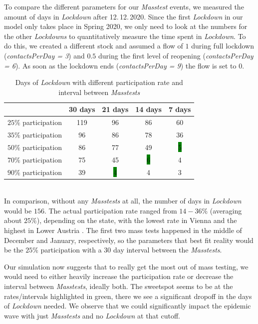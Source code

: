 \documentclass
[
    report,
    11pt,
    bibliography = totoc,
    listof = totoc,
    headinclude = true,
]
{scrreport}
\begin{document}
To compare the different parameters for our \textit{Masstest} events, we measured the amount of days in \textit{Lockdown} after 12.\,12.\,2020. Since the first \textit{Lockdown} in our model only
takes place in Spring 2020, we only need to look at the numbers for the other \textit{Lockdowns}
to quantitatively measure the time spent in \textit{Lockdown}.
To do this, we created a different stock and assumed a flow of $1$ during full lockdown
(\textit{contactsPerDay = 3}) and $0.5$ during the first level of reopening
(\textit{contactsPerDay = 6}). As soon as the lockdown ends (\textit{contactsPerDay = 9})
the flow is set to 0.
\begin{table}[!h]
{\small%
\begin{center}
\begin{tabular}{|c||c|c|c|c|}
\hline
& 30 days   & 21 days   & 14 days   & 7 days  \\
 \hline
 \hline
     $25\%$ participation & 119 &96 & 86 & 60\\
 \hline
     $35\%$ participation & 96 &  86&  78  & 36   \\
 \hline
     $50\%$ participation & 86 & 77 & 49 & \colorbox{green}{5}\\
 \hline
     $70\%$ participation & 75 &  45 & \colorbox{green}{6} & 4 \\
 \hline
     $90\%$ participation & 39 & \colorbox{green}{4} &4  & 3\\
     \hline
\end{tabular}
\end{center}
}

\caption{Days of \textit{Lockdown} with different participation rate and interval between \textit{Masstests}}
\end{table} \\
In comparison, without any \textit{Masstests} at all, the number of days in \textit{Lockdown} would be $156$. The actual participation rate ranged from $14 - 36\%$ (averaging about $25\%$), depending on the state, with the lowest rate in Vienna and the highest in Lower Austria \cite{MassTests}. The first two mass tests happened in the middle of December and January, respectively, so the parameters that best fit reality would be the $25\%$ participation with a $30$ day interval between the \textit{Masstests}.

Our simulation now suggests that to really get the most out of mass testing, we would need to either heavily increase the participation rate or decrease the interval between \textit{Masstests}, ideally both. The sweetspot seems to be at the rates/intervals highlighted in green, there we see a significant dropoff in the days of \textit{Lockdown} needed. We observe that we could significantly impact the epidemic wave with just \textit{Masstests} and no \textit{Lockdown} at that cutoff.
\end{document}
